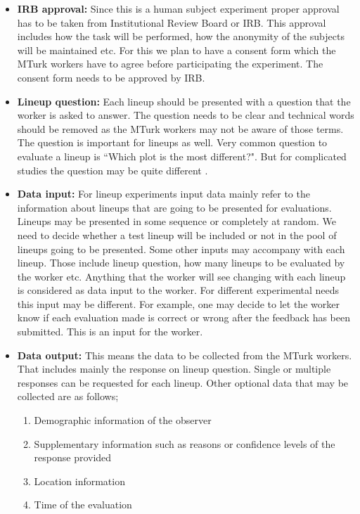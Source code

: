\documentclass[11pt]{article}
\begin{document}
\begin{itemize}

\item {\bf IRB approval:} Since this is a human subject experiment proper approval has to be taken from Institutional Review Board or IRB. This approval includes how the task will be performed, how the anonymity of the subjects will be maintained etc. For this we plan to have a consent form which the MTurk workers have to agree before participating the experiment. The consent form needs to be approved by IRB.
 
\item {\bf Lineup question:} Each lineup should be presented with a question that the worker is asked to answer. The question needs to be clear and technical words should be removed as the MTurk workers may not be aware of those terms. The question is important for lineups as well. Very common question to evaluate a lineup is ``Which plot is the most different?". But for complicated studies the question may be quite different \citep{majumder:socio}.

\item {\bf Data input:} For lineup experiments input data mainly refer to the information about lineups that are going to be presented for evaluations. Lineups may be presented in some sequence or completely at random. We need to decide whether a test lineup will be included or not in the pool of lineups going to be presented. Some other inputs may accompany with each lineup. Those include lineup question, how many lineups to be evaluated by the worker etc. Anything that the worker will see changing with each lineup is considered as data input to the worker. For different experimental needs this input may be different. For example, one may decide to let the worker know if each evaluation made is correct or wrong after the feedback has been submitted. This is an input for the worker.

\item {\bf Data output:} This means the data to be collected from the MTurk workers. That includes mainly the response on lineup question. Single or multiple responses can be requested for each lineup. Other optional data that may be collected are as follows;

\begin{enumerate}
\item Demographic information of the observer
\item Supplementary information such as reasons or confidence levels of the response provided
\item Location information
\item Time of the evaluation
\end{enumerate}


\end{itemize}
\end{document}
